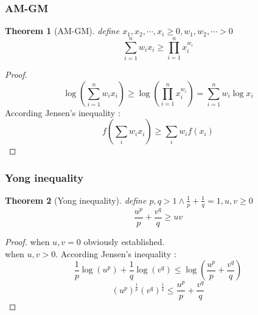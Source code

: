 \documentclass[10pt,a4paper]{article}
\newtheorem{theorem}{Theorem}[section]
\begin{document}
\subsubsection{AM-GM}
\begin{theorem}[AM-GM]
    define $x_1,x_2,\cdots,x_i\ge0, w_1,w_2,\cdots>0$
    \[\sum\limits_{i=1}^{n}w_ix_i\ge\prod\limits_{i=1}^{n}x_i^{w_i}\]
\end{theorem}
\begin{proof}
    \[\log(\sum\limits_{i=1}^{n}w_ix_i)\ge\log(\prod\limits_{i=1}^{n}x_i^{w_i})=\sum\limits_{i=1}^{n}w_i\log x_i\]
    According Jensen's inequality :\\\[f(\sum\limits_i w_ix_i)\ge\sum\limits_i w_if(x_i)\]
\end{proof}
\subsubsection{Yong inequality}
\begin{theorem}[Yong inequality]
    define $p,q>1\land \frac{1}{p}+\frac{1}{q}=1,u,v\ge0$
    \[\frac{u^p}{p}+\frac{v^q}{q}\ge uv\]
\end{theorem}
\begin{proof}
    when $u,v=0$ obviously established.\\
    when $u,v>0$. According Jensen's inequality :\\
    \[\frac{1}{p}\log(u^p)+\frac{1}{q}\log(v^q)\le\log(\frac{u^p}{p}+\frac{v^q}{q})\]
    \[(u^p)^{\frac{1}{p}}(v^q)^{\frac{1}{q}}\le\frac{u^p}{p}+\frac{v^q}{q}\]
\end{proof}
\end{document}

